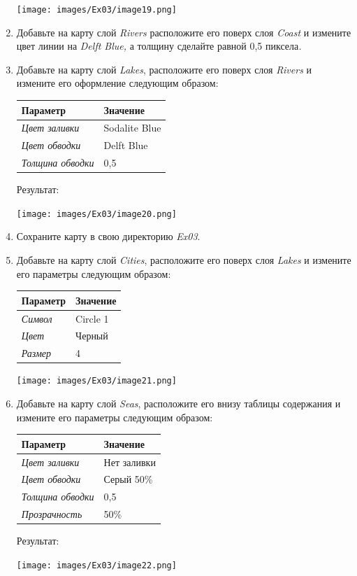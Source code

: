 \documentclass[12pt,]{book}
\begin{document}
\begin{enumerate}
  \texttt{[image: images/Ex03/image19.png]}
\item
  Добавьте на карту слой \emph{Rivers} расположите его поверх слоя \emph{Coast} и измените цвет линии на \emph{Delft Blue,} а толщину сделайте равной 0,5 пиксела\emph{.}
\item
  Добавьте на карту слой \emph{Lakes}, расположите его поверх слоя \emph{Rivers} и измените его оформление следующим образом:

  \begin{longtable}[]{@{}ll@{}}
  \toprule
  \textbf{Параметр} & \textbf{Значение}\tabularnewline
  \midrule
  \endhead
  \emph{Цвет заливки} & Sodalite Blue\tabularnewline
  \emph{Цвет обводки} & Delft Blue\tabularnewline
  \emph{Толщина обводки} & 0,5\tabularnewline
  \bottomrule
  \end{longtable}

  Результат:

  \texttt{[image: images/Ex03/image20.png]}
\item
  Сохраните карту в свою директорию \emph{Ex03}.
\item
  Добавьте на карту слой \emph{Cities}, расположите его поверх слоя \emph{Lakes} и измените его параметры следующим образом:

  \begin{longtable}[]{@{}ll@{}}
  \toprule
  \textbf{Параметр} & \textbf{Значение}\tabularnewline
  \midrule
  \endhead
  \emph{Символ} & Circle 1\tabularnewline
  \emph{Цвет} & Черный\tabularnewline
  \emph{Размер} & 4\tabularnewline
  \bottomrule
  \end{longtable}

  \texttt{[image: images/Ex03/image21.png]}
\item
  Добавьте на карту слой \emph{Seas}, расположите его внизу таблицы содержания и измените его параметры следующим образом:

  \begin{longtable}[]{@{}ll@{}}
  \toprule
  \textbf{Параметр} & \textbf{Значение}\tabularnewline
  \midrule
  \endhead
  \emph{Цвет заливки} & Нет заливки\tabularnewline
  \emph{Цвет обводки} & Серый 50\%\tabularnewline
  \emph{Толщина обводки} & 0,5\tabularnewline
  \emph{Прозрачность} & 50\%\tabularnewline
  \bottomrule
  \end{longtable}

  Результат:

  \texttt{[image: images/Ex03/image22.png]}
\end{enumerate}
\end{document}
